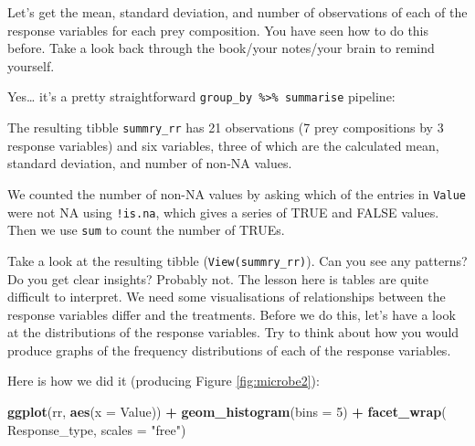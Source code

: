 \documentclass[]{book}
\newenvironment{Shaded}{\begin{snugshade}}{\end{snugshade}}
\newcommand{\DataTypeTok}[1]{\textcolor[rgb]{0.13,0.29,0.53}{#1}}
\newcommand{\DecValTok}[1]{\textcolor[rgb]{0.00,0.00,0.81}{#1}}
\newcommand{\KeywordTok}[1]{\textcolor[rgb]{0.13,0.29,0.53}{\textbf{#1}}}
\newcommand{\NormalTok}[1]{#1}
\newcommand{\OperatorTok}[1]{\textcolor[rgb]{0.81,0.36,0.00}{\textbf{#1}}}
\newcommand{\OtherTok}[1]{\textcolor[rgb]{0.56,0.35,0.01}{#1}}
\newcommand{\StringTok}[1]{\textcolor[rgb]{0.31,0.60,0.02}{#1}}
\begin{document}
Let's get the mean, standard deviation, and number of observations of each of the response variables for each prey composition. You have seen how to do this before. Take a look back through the book/your notes/your brain to remind yourself.

Yes\ldots{} it's a pretty straightforward \texttt{group\_by\ \%\textgreater{}\%\ summarise} pipeline:

\begin{Shaded}
\end{Shaded}

The resulting tibble \texttt{summry\_rr} has 21 observations (7 prey compositions by 3 response variables) and six variables, three of which are the calculated mean, standard deviation, and number of non-NA values.

\begin{info}
We counted the number of non-NA values by asking which of the entries in
\texttt{Value} were not NA using \texttt{!is.na}, which gives a series
of TRUE and FALSE values. Then we use \texttt{sum} to count the number
of TRUEs.
\end{info}

Take a look at the resulting tibble (\texttt{View(summry\_rr)}). Can you see any patterns? Do you get clear insights? Probably not. The lesson here is tables are quite difficult to interpret. We need some visualisations of relationships between the response variables differ and the treatments. Before we do this, let's have a look at the distributions of the response variables. Try to think about how you would produce graphs of the frequency distributions of each of the response variables.

Here is how we did it (producing Figure \ref{fig:microbe2}):

\begin{Shaded}
\begin{Highlighting}[]
\KeywordTok{ggplot}\NormalTok{(rr, }\KeywordTok{aes}\NormalTok{(}\DataTypeTok{x =}\NormalTok{ Value)) }\OperatorTok{+}
\StringTok{  }\KeywordTok{geom_histogram}\NormalTok{(}\DataTypeTok{bins =} \DecValTok{5}\NormalTok{) }\OperatorTok{+}
\StringTok{  }\KeywordTok{facet_wrap}\NormalTok{(}\OperatorTok{~}\StringTok{ }\NormalTok{Response_type, }\DataTypeTok{scales =} \StringTok{"free"}\NormalTok{)}
\end{Highlighting}
\end{Shaded}
\end{document}
